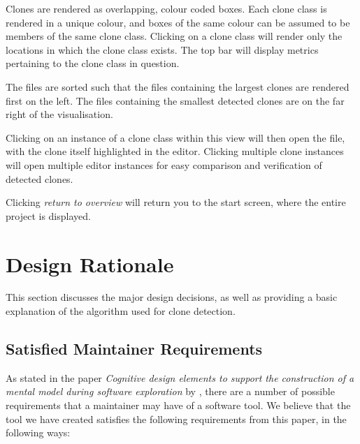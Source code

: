 \documentclass{article}
\begin{document}
Clones are rendered as overlapping, colour coded boxes. Each clone class is rendered in a unique colour, and boxes of the same colour can be assumed to be members of the same clone class. Clicking on a clone class will render only the locations in which the clone class exists. The top bar will display metrics pertaining to the clone class in question.

The files are sorted such that the files containing the largest clones are rendered first on the left. The files containing the smallest detected clones are on the far right of the visualisation.

Clicking on an instance of a clone class within this view will then open the file, with the clone itself highlighted in the editor. Clicking multiple clone instances will open multiple editor instances for easy comparison and verification of detected clones.

Clicking \textit{return to overview} will return you to the start screen, where the entire project is displayed.

\section{Design Rationale}

This section discusses the major design decisions, as well as providing a basic explanation of the algorithm used for clone detection.

\subsection{Satisfied Maintainer Requirements}

As stated in the paper \textit{Cognitive design elements to support the construction of a mental model during software exploration} by \citeauthor{Storey1999171}, there are a number of possible requirements that a maintainer may have of a software tool. We believe that the tool we have created satisfies the following requirements\cite{Storey1999171} from this paper, in the following ways:
\end{document}
